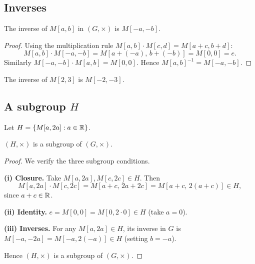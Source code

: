 \subsection{Inverses}

\begin{proposition}
The inverse of $M[a, b]$ in $(G, \times)$ is $M[-a, -b]$.
\end{proposition}

\begin{proof}
Using the multiplication rule $M[a,b]\cdot M[c,d] = M[a+c,b+d]$:
\[
    M[a,b] \cdot M[-a,-b] = M[a+(-a),\, b+(-b)] = M[0,0] = e.
\]
Similarly $M[-a,-b]\cdot M[a,b] = M[0,0]$. Hence $M[a,b]^{-1} = M[-a,-b]$.
\end{proof}

\begin{example}
The inverse of $M[2,3]$ is $M[-2,-3]$.
\end{example}

\subsection{A subgroup \texorpdfstring{$H$}{H}}

Let $H = \{M[a, 2a] : a \in \mathbb{R}\}$.

\begin{proposition}
$(H, \times)$ is a subgroup of $(G, \times)$.
\end{proposition}

\begin{proof}
We verify the three subgroup conditions.

\textbf{(i) Closure.}
Take $M[a,2a], M[c,2c] \in H$. Then
\[
    M[a,2a] \cdot M[c,2c] = M[a+c,\, 2a+2c] = M[a+c,\, 2(a+c)] \in H,
\]
since $a + c \in \mathbb{R}$.

\textbf{(ii) Identity.}
$e = M[0,0] = M[0, 2\cdot 0] \in H$ (take $a = 0$).

\textbf{(iii) Inverses.}
For any $M[a,2a] \in H$, its inverse in $G$ is $M[-a,-2a] = M[-a, 2(-a)] \in H$
(setting $b = -a$).

Hence $(H, \times)$ is a subgroup of $(G, \times)$.
\end{proof}


